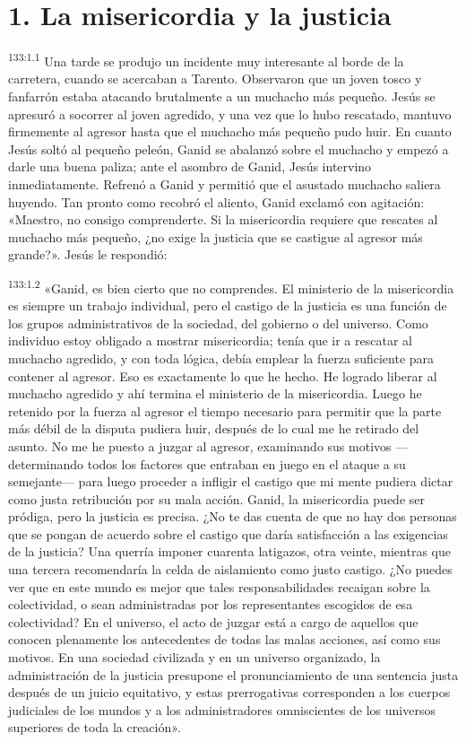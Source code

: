 \section*{1. La misericordia y la justicia}
\par
\textsuperscript{133:1.1} Una tarde se produjo un incidente muy interesante al borde de la carretera, cuando se acercaban a Tarento. Observaron que un joven tosco y fanfarrón estaba atacando brutalmente a un muchacho más pequeño. Jesús se apresuró a socorrer al joven agredido, y una vez que lo hubo rescatado, mantuvo firmemente al agresor hasta que el muchacho más pequeño pudo huir. En cuanto Jesús soltó al pequeño peleón, Ganid se abalanzó sobre el muchacho y empezó a darle una buena paliza; ante el asombro de Ganid, Jesús intervino inmediatamente. Refrenó a Ganid y permitió que el asustado muchacho saliera huyendo. Tan pronto como recobró el aliento, Ganid exclamó con agitación: «Maestro, no consigo comprenderte. Si la misericordia requiere que rescates al muchacho más pequeño, ¿no exige la justicia que se castigue al agresor más grande?». Jesús le respondió:

\par
\textsuperscript{133:1.2} «Ganid, es bien cierto que no comprendes. El ministerio de la misericordia es siempre un trabajo individual, pero el castigo de la justicia es una función de los grupos administrativos de la sociedad, del gobierno o del universo. Como individuo estoy obligado a mostrar misericordia; tenía que ir a rescatar al muchacho agredido, y con toda lógica, debía emplear la fuerza suficiente para contener al agresor. Eso es exactamente lo que he hecho. He logrado liberar al muchacho agredido y ahí termina el ministerio de la misericordia. Luego he retenido por la fuerza al agresor el tiempo necesario para permitir que la parte más débil de la disputa pudiera huir, después de lo cual me he retirado del asunto. No me he puesto a juzgar al agresor, examinando sus motivos ---determinando todos los factores que entraban en juego en el ataque a su semejante--- para luego proceder a infligir el castigo que mi mente pudiera dictar como justa retribución por su mala acción. Ganid, la misericordia puede ser pródiga, pero la justicia es precisa. ¿No te das cuenta de que no hay dos personas que se pongan de acuerdo sobre el castigo que daría satisfacción a las exigencias de la justicia? Una querría imponer cuarenta latigazos, otra veinte, mientras que una tercera recomendaría la celda de aislamiento como justo castigo. ¿No puedes ver que en este mundo es mejor que tales responsabilidades recaigan sobre la colectividad, o sean administradas por los representantes escogidos de esa colectividad? En el universo, el acto de juzgar está a cargo de aquellos que conocen plenamente los antecedentes de todas las malas acciones, así como sus motivos. En una sociedad civilizada y en un universo organizado, la administración de la justicia presupone el pronunciamiento de una sentencia justa después de un juicio equitativo, y estas prerrogativas corresponden a los cuerpos judiciales de los mundos y a los administradores omniscientes de los universos superiores de toda la creación».

